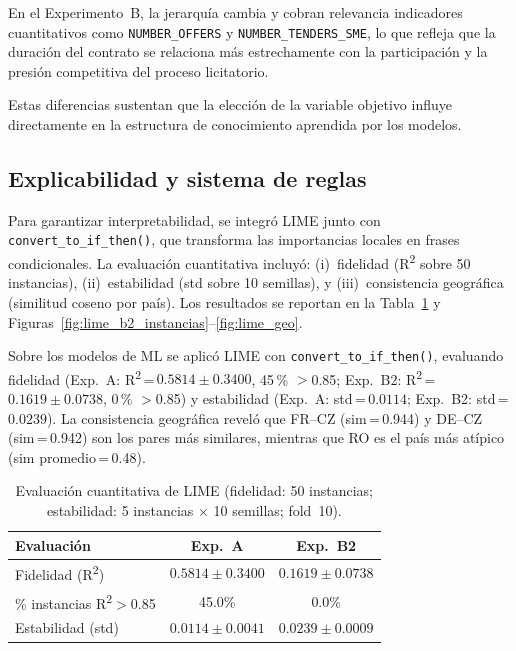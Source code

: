 \documentclass[a4paper,fleqn]{cas-sc}
\begin{document}
 	En el Experimento~B, la jerarquía cambia y cobran relevancia indicadores cuantitativos como \texttt{NUMBER\_OFFERS} y \texttt{NUMBER\_TENDERS\_SME}, lo que refleja que la duración del contrato se relaciona más estrechamente con la participación y la presión competitiva del proceso licitatorio.
 	
 	Estas diferencias sustentan que la elección de la variable objetivo influye directamente en la estructura de conocimiento aprendida por los modelos.
 
 
 \subsection{Explicabilidad y sistema de reglas}


	Para garantizar interpretabilidad, se integró LIME junto con \texttt{convert\_to\_if\_then()}, que transforma las importancias locales en frases condicionales. La evaluación cuantitativa incluyó: (i)~fidelidad (R\textsuperscript{2} sobre 50 instancias), (ii)~estabilidad (std sobre 10 semillas), y (iii)~consistencia geográfica (similitud coseno por país). Los resultados se reportan en la Tabla~\ref{tab:xai_eval} y Figuras~\ref{fig:lime_b2_instancias}--\ref{fig:lime_geo}.
 
 
	Sobre los modelos de ML se aplicó LIME con \texttt{convert\_to\_if\_then()}, evaluando fidelidad (Exp.~A: R\textsuperscript{2}\,=\,$0.5814 \pm 0.3400$, 45\,\% $>$0.85; Exp.~B2: R\textsuperscript{2}\,=\,$0.1619 \pm 0.0738$, 0\,\% $>$0.85) y estabilidad (Exp.~A: std\,=\,$0.0114$; Exp.~B2: std\,=\,$0.0239$). La consistencia geográfica reveló que FR--CZ (sim\,=\,0.944) y DE--CZ (sim\,=\,0.942) son los pares más similares, mientras que RO es el país más atípico (sim promedio\,=\,0.48).


\begin{table}[ht]
\small\centering
\caption{Evaluación cuantitativa de LIME (fidelidad: 50 instancias; estabilidad: 5 instancias $\times$ 10 semillas; fold~10).}
\label{tab:xai_eval}
\begin{tabular}{lcc}\hline
\textbf{Evaluación} & \textbf{Exp.~A} & \textbf{Exp.~B2} \\ \hline
Fidelidad (R\textsuperscript{2}) & $0.5814 \pm 0.3400$ & $0.1619 \pm 0.0738$ \\
\% instancias R\textsuperscript{2}$>$0.85 & 45.0\% & 0.0\% \\
Estabilidad (std) & $0.0114 \pm 0.0041$ & $0.0239 \pm 0.0009$ \\
\hline\end{tabular}\end{table}
\end{document}
